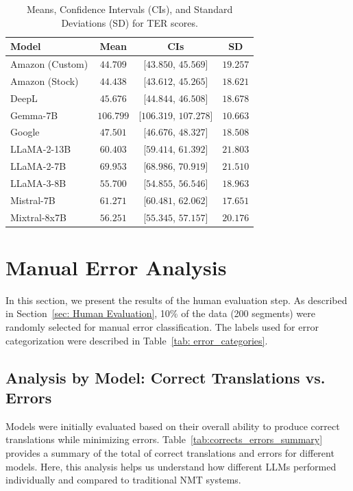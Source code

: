 \begin{table}[htb]
\centering
\begin{tabular}{lccc}
\toprule
\textbf{Model} & \textbf{Mean} & \textbf{CIs} & \textbf{SD} \\
\midrule
Amazon (Custom) & $44.709$ & [$43.850$, $45.569$] & $19.257$ \\
Amazon (Stock) & $\mathbf{44.438}$ & [$43.612$, $45.265$] & $18.621$ \\
DeepL & $45.676$ & [$44.844$, $46.508$] & $18.678$ \\
Gemma-7B & $106.799$ & [$106.319$, $107.278$] & $10.663$ \\
Google & $47.501$ & [$46.676$, $48.327$] & $18.508$ \\
LLaMA-2-13B & $60.403$ & [$59.414$, $61.392$] & $21.803$ \\
LLaMA-2-7B & $69.953$ & [$68.986$, $70.919$] & $21.510$ \\
LLaMA-3-8B & $55.700$ & [$54.855$, $56.546$] & $18.963$ \\
Mistral-7B & $61.271$ & [$60.481$, $62.062$] & $17.651$ \\
Mixtral-8x7B & $56.251$ & [$55.345$, $57.157$] & $20.176$ \\
\bottomrule
\end{tabular}
\caption{Means, Confidence Intervals (CIs), and Standard Deviations (SD) for TER scores.}
\label{tab:mean_ci_scores_ter}
\end{table}



\section{Manual Error Analysis}
\label{sec: Error-analysis}

In this section, we present the results of the human evaluation step. As described in Section~\ref{sec: Human Evaluation}, 10\% of the data (200 segments) were randomly selected for manual error classification. The labels used for error categorization were described in Table~\ref{tab: error_categories}.


\subsection{Analysis by Model: Correct Translations vs. Errors}

Models were initially evaluated based on their overall ability to produce correct translations while minimizing errors. Table~\ref{tab:corrects_errors_summary} provides a summary of the total of correct translations and errors for different models. Here, this analysis helps us understand how different LLMs performed individually and compared to traditional NMT systems.

